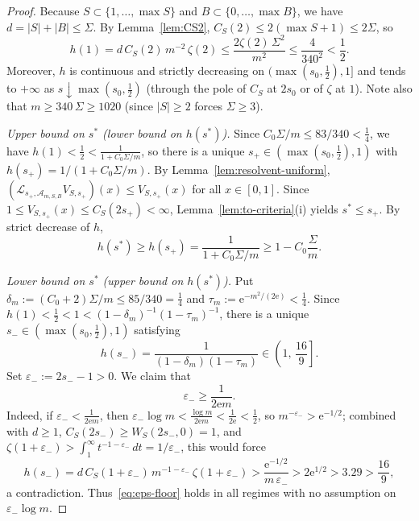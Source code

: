 \documentclass[11pt]{article}
\theoremstyle{definition}
\theoremstyle{remark}
\newcommand{\ee}{\mathrm{e}}
\begin{document}
\begin{proof}
Because $S\subset\{1,\dots,\max S\}$ and $B\subset\{0,\dots,\max B\}$, we have
$d=|S|+|B|\le\Sigma$. By Lemma~\ref{lem:CS2}, $C_S(2)\le 2(\max S+1)\le 2\Sigma$,
so
\[
h(1)=d\,C_S(2)\,m^{-2}\,\zeta(2)
\le \frac{2\zeta(2)\,\Sigma^2}{m^2}
\le \frac{4}{340^2}<\frac12.
\]
Moreover, $h$ is continuous and strictly decreasing on $(\max(s_0,\frac12),1]$
and tends to $+\infty$ as $s\downarrow\max(s_0,\frac12)$ (through the pole of
$C_S$ at $2s_0$ or of $\zeta$ at $1$). Note also that $m\ge 340\,\Sigma\ge 1020$
(since $|S|\ge2$ forces $\Sigma\ge 3$).

\emph{Upper bound on $s^*$ (lower bound on $h(s^*)$).}
Since $C_0\Sigma/m\le 83/340<\frac14$, we have
$h(1)<\frac12<\frac{1}{1+C_0\Sigma/m}$, so there is a unique
$s_+\in(\max(s_0,\frac12),1)$ with $h(s_+)=1/(1+C_0\Sigma/m)$. By
Lemma~\ref{lem:resolvent-uniform},
$(\mathcal L_{s_+,\mathcal A_{m,S,B}}V_{S,s_+})(x)\le V_{S,s_+}(x)$ for all
$x\in[0,1]$. Since $1\le V_{S,s_+}(x)\le C_S(2s_+)<\infty$,
Lemma~\ref{lem:to-criteria}(i) yields $s^*\le s_+$. By strict decrease of $h$,
\begin{equation}\label{eq:h-lower}
h(s^*)\ge h(s_+)=\frac{1}{1+C_0\Sigma/m}\ge 1-C_0\frac{\Sigma}{m}.
\end{equation}

\emph{Lower bound on $s^*$ (upper bound on $h(s^*)$).}
Put $\delta_m:=(C_0+2)\Sigma/m\le 85/340=\frac14$ and
$\tau_m:=\ee^{-m^2/(2\ee)}<\frac14$. Since $h(1)<\frac12<1<(1-\delta_m)^{-1}(1-\tau_m)^{-1}$,
there is a unique $s_-\in(\max(s_0,\frac12),1)$ satisfying
\[
h(s_-)=\frac{1}{(1-\delta_m)(1-\tau_m)}\in\left(1,\,\frac{16}{9}\right].
\]
Set $\varepsilon_-:=2s_--1>0$. We claim that
\begin{equation}\label{eq:eps-floor}
\varepsilon_-\ge\frac{1}{2\ee m}.
\end{equation}
Indeed, if $\varepsilon_-<\frac{1}{2\ee m}$, then
$\varepsilon_-\log m<\frac{\log m}{2\ee m}<\frac{1}{2\ee}<\frac12$, so
$m^{-\varepsilon_-}>\ee^{-1/2}$; combined with $d\ge1$, $C_S(2s_-)\ge W_S(2s_-,0)=1$,
and $\zeta(1+\varepsilon_-)>\int_1^\infty t^{-1-\varepsilon_-}\,dt=1/\varepsilon_-$,
this would force
\[
h(s_-)=d\,C_S(1+\varepsilon_-)\,m^{-1-\varepsilon_-}\,\zeta(1+\varepsilon_-)
>\frac{\ee^{-1/2}}{m\,\varepsilon_-}>2\ee^{1/2}>3.29>\frac{16}{9},
\]
a contradiction. Thus~\eqref{eq:eps-floor} holds in all regimes with no
assumption on $\varepsilon_-\log m$.


\end{proof}
\end{document}
